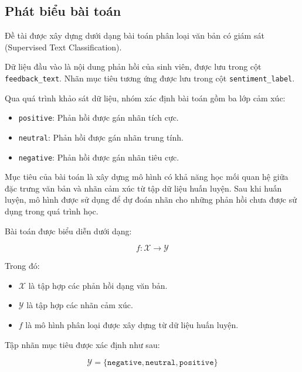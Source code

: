 \subsection{Phát biểu bài toán}

Đề tài được xây dựng dưới dạng bài toán phân loại văn bản có giám sát (Supervised Text Classification).

Dữ liệu đầu vào là nội dung phản hồi của sinh viên, được lưu trong cột \texttt{feedback\_text}. Nhãn mục tiêu tương ứng được lưu trong cột \texttt{sentiment\_label}.

Qua quá trình khảo sát dữ liệu, nhóm xác định bài toán gồm ba lớp cảm xúc:

\begin{itemize}
    \item \texttt{positive}: Phản hồi được gán nhãn tích cực.

    \item \texttt{neutral}: Phản hồi được gán nhãn trung tính.

    \item \texttt{negative}: Phản hồi được gán nhãn tiêu cực.
\end{itemize}

Mục tiêu của bài toán là xây dựng mô hình có khả năng học mối quan hệ giữa đặc trưng văn bản và nhãn cảm xúc từ tập dữ liệu huấn luyện. Sau khi huấn luyện, mô hình được sử dụng để dự đoán nhãn cho những phản hồi chưa được sử dụng trong quá trình học.

Bài toán được biểu diễn dưới dạng:

\begin{equation}
    f: \mathcal{X} \rightarrow \mathcal{Y}
\end{equation}

Trong đó:

\begin{itemize}
    \item $\mathcal{X}$ là tập hợp các phản hồi dạng văn bản.

    \item $\mathcal{Y}$ là tập hợp các nhãn cảm xúc.

    \item $f$ là mô hình phân loại được xây dựng từ dữ liệu huấn luyện.
\end{itemize}

Tập nhãn mục tiêu được xác định như sau:

\begin{equation}
    \mathcal{Y} =
    \{
    \texttt{negative},
    \texttt{neutral},
    \texttt{positive}
    \}
\end{equation}

